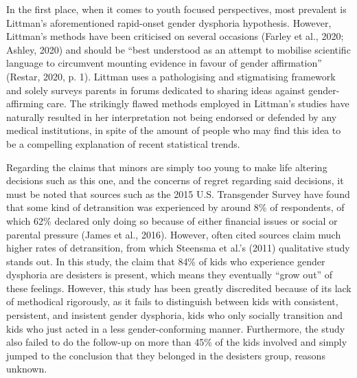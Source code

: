 \documentclass{article}
\begin{document}
In the first place, when it comes to youth focused perspectives, most prevalent is Littman’s aforementioned rapid-onset gender dysphoria hypothesis. However, Littman’s methods have been criticised on several occasions (Farley et al., 2020; Ashley, 2020) and should be “best understood as an attempt to mobilise scientific language to circumvent mounting evidence in favour of gender affirmation” (Restar, 2020, p. 1). Littman uses a pathologising and stigmatising framework and solely surveys parents in forums dedicated to sharing ideas against gender-affirming care. The strikingly flawed methods employed in Littman’s studies have naturally resulted in her interpretation not being endorsed or defended by any medical institutions, in spite of the amount of people who may find this idea to be a compelling explanation of recent statistical trends.\par

Regarding the claims that minors are simply too young to make life altering decisions such as this one, and the concerns of regret regarding said decisions, it must be noted that sources such as the 2015 U.S. Transgender Survey have found that some kind of detransition was experienced by around 8\% of respondents, of which 62\% declared only doing so because of either financial issues or social or parental pressure (James et al., 2016). However, often cited sources claim much higher rates of detransition, from which Steensma et al.'s (2011) qualitative study stands out. In this study, the claim that 84\% of kids who experience gender dysphoria are desisters is present, which means they eventually “grow out” of these feelings. However, this study has been greatly discredited because of its lack of methodical rigorously, as it fails to distinguish between kids with consistent, persistent, and insistent gender dysphoria, kids who only socially transition and kids who just acted in a less gender-conforming manner. Furthermore, the study also failed to do the follow-up on more than 45\% of the kids involved and simply jumped to the conclusion that they belonged in the desisters group, reasons unknown.\par
\end{document}
